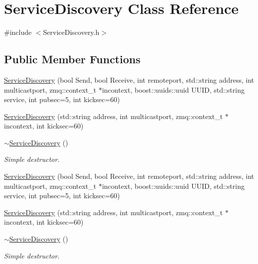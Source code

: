 \hypertarget{classServiceDiscovery}{\section{Service\-Discovery Class Reference}
\label{classServiceDiscovery}
}


{\ttfamily \#include $<$Service\-Discovery.\-h$>$}

\subsection*{Public Member Functions}
\begin{DoxyCompactItemize}
\item 
\hyperlink{classServiceDiscovery_ab69c2cacaf5a388fac88e57f3361b576}{Service\-Discovery} (bool Send, bool Receive, int remoteport, std\-::string address, int multicastport, zmq\-::context\-\_\-t $\ast$incontext, boost\-::uuids\-::uuid U\-U\-I\-D, std\-::string service, int pubsec=5, int kicksec=60)
\item 
\hyperlink{classServiceDiscovery_a3dbd15f19345b0c9746731308e26b034}{Service\-Discovery} (std\-::string address, int multicastport, zmq\-::context\-\_\-t $\ast$incontext, int kicksec=60)
\item 
\hypertarget{classServiceDiscovery_aee64ecb3b4c07b7f2a070a66ecb7dc70}{\hyperlink{classServiceDiscovery_aee64ecb3b4c07b7f2a070a66ecb7dc70}{$\sim$\-Service\-Discovery} ()}\label{classServiceDiscovery_aee64ecb3b4c07b7f2a070a66ecb7dc70}

\begin{DoxyCompactList}\small\item\em Simple destructor. \end{DoxyCompactList}\item 
\hyperlink{classServiceDiscovery_ab69c2cacaf5a388fac88e57f3361b576}{Service\-Discovery} (bool Send, bool Receive, int remoteport, std\-::string address, int multicastport, zmq\-::context\-\_\-t $\ast$incontext, boost\-::uuids\-::uuid U\-U\-I\-D, std\-::string service, int pubsec=5, int kicksec=60)
\item 
\hyperlink{classServiceDiscovery_a3dbd15f19345b0c9746731308e26b034}{Service\-Discovery} (std\-::string address, int multicastport, zmq\-::context\-\_\-t $\ast$incontext, int kicksec=60)
\item 
\hypertarget{classServiceDiscovery_aee64ecb3b4c07b7f2a070a66ecb7dc70}{\hyperlink{classServiceDiscovery_aee64ecb3b4c07b7f2a070a66ecb7dc70}{$\sim$\-Service\-Discovery} ()}\label{classServiceDiscovery_aee64ecb3b4c07b7f2a070a66ecb7dc70}

\begin{DoxyCompactList}\small\item\em Simple destructor. \end{DoxyCompactList}\end{DoxyCompactItemize}


